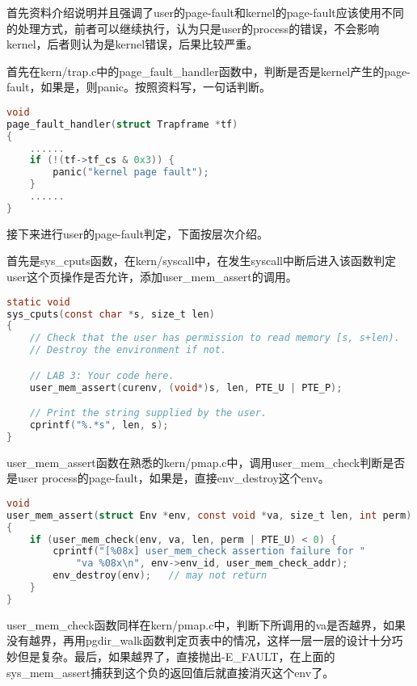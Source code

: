 \documentclass[11pt,a4paper]{article}
\begin{document}
首先资料介绍说明并且强调了user的page-fault和kernel的page-fault应该使用不同的处理方式，前者可以继续执行，认为只是user的process的错误，不会影响kernel，后者则认为是kernel错误，后果比较严重。

首先在kern/trap.c中的page\_fault\_handler函数中，判断是否是kernel产生的page-fault，如果是，则panic。按照资料写，一句话判断。

\setmainfont{Consolas}
\begin{lstlisting}[language={C},firstnumber=1,title=kern/trap.c]
void
page_fault_handler(struct Trapframe *tf)
{
	......
	if (!(tf->tf_cs & 0x3)) {
		panic("kernel page fault");
	}
	......
}
\end{lstlisting}
\setmainfont[BoldFont=黑体]{宋体}

接下来进行user的page-fault判定，下面按层次介绍。

首先是sys\_cputs函数，在kern/syscall中，在发生syscall中断后进入该函数判定user这个页操作是否允许，添加user\_mem\_assert的调用。

\setmainfont{Consolas}
\begin{lstlisting}[language={C},firstnumber=1,title=kern/syscall.c]
static void
sys_cputs(const char *s, size_t len)
{
	// Check that the user has permission to read memory [s, s+len).
	// Destroy the environment if not.

	// LAB 3: Your code here.
	user_mem_assert(curenv, (void*)s, len, PTE_U | PTE_P);

	// Print the string supplied by the user.
	cprintf("%.*s", len, s);
}
\end{lstlisting}
\setmainfont[BoldFont=黑体]{宋体}

user\_mem\_assert函数在熟悉的kern/pmap.c中，调用user\_mem\_check判断是否是user process的page-fault，如果是，直接env\_destroy这个env。

\setmainfont{Consolas}
\begin{lstlisting}[language={C},firstnumber=1,title=kern/pmap.c]
void
user_mem_assert(struct Env *env, const void *va, size_t len, int perm)
{
	if (user_mem_check(env, va, len, perm | PTE_U) < 0) {
		cprintf("[%08x] user_mem_check assertion failure for "
			"va %08x\n", env->env_id, user_mem_check_addr);
		env_destroy(env);	// may not return
	}
}
\end{lstlisting}
\setmainfont[BoldFont=黑体]{宋体}

user\_mem\_check函数同样在kern/pmap.c中，判断下所调用的va是否越界，如果没有越界，再用pgdir\_walk函数判定页表中的情况，这样一层一层的设计十分巧妙但是复杂。最后，如果越界了，直接抛出-E\_FAULT，在上面的sys\_mem\_assert捕获到这个负的返回值后就直接消灭这个env了。
\end{document}
